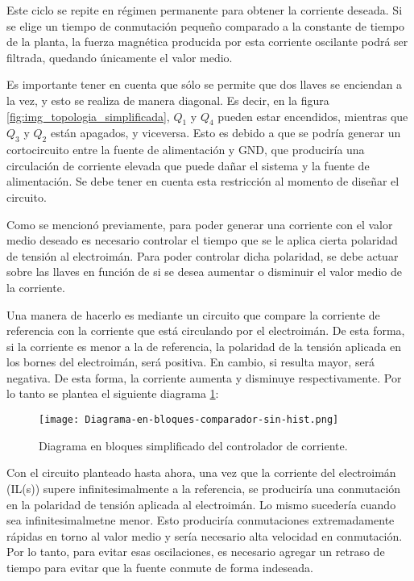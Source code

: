Este ciclo se repite en régimen permanente para obtener la corriente deseada. Si se elige un tiempo de conmutación pequeño comparado a la constante de tiempo de la planta, la fuerza magnética producida por esta corriente oscilante podrá ser filtrada, quedando únicamente el valor medio.

Es importante tener en cuenta que sólo se permite que dos llaves se enciendan a la vez, y esto se realiza de manera diagonal. Es decir, en la figura \ref{fig:img_topologia_simplificada}, $Q_1$ y $Q_4$ pueden estar encendidos, mientras que $Q_3$ y $Q_2$ están apagados, y viceversa. Esto es debido a que se podría generar un cortocircuito entre la fuente de alimentación y GND, que produciría una circulación de corriente elevada que puede dañar el sistema y la fuente de alimentación. Se debe tener en cuenta esta restricción al momento de diseñar el circuito.

Como se mencionó previamente, para poder generar una corriente con el valor medio deseado es necesario controlar el tiempo que se le aplica cierta polaridad de tensión al electroimán. Para poder controlar dicha polaridad, se debe actuar sobre las llaves en función de si se desea aumentar o disminuir el valor medio de la corriente. 

Una manera de hacerlo es mediante un circuito que compare la corriente de referencia con la corriente que está circulando por el electroimán. De esta forma, si la corriente es menor a la de referencia, la polaridad de la tensión aplicada en los bornes del electroimán, será positiva. En cambio, si resulta mayor, será negativa. De esta forma, la corriente aumenta y disminuye respectivamente. Por lo tanto se plantea el siguiente diagrama \ref{fig:img_diag-en-bloques-comparador-sin-hist}:

\begin{figure}[H]
	\centering
	\texttt{[image: Diagrama-en-bloques-comparador-sin-hist.png]}
	\caption{Diagrama en bloques simplificado del controlador de corriente.}
	\label{fig:img_diag-en-bloques-comparador-sin-hist}
\end{figure}

Con el circuito planteado hasta ahora, una vez que la corriente del electroimán (IL(s)) supere infinitesimalmente a la referencia, se produciría una conmutación en la polaridad de tensión aplicada al electroimán. Lo mismo sucedería cuando sea infinitesimalmetne menor. Esto produciría conmutaciones extremadamente rápidas en torno al valor medio y sería necesario alta velocidad en conmutación. Por lo tanto, para evitar esas oscilaciones, es necesario agregar un retraso de tiempo para evitar que la fuente conmute de forma indeseada.


